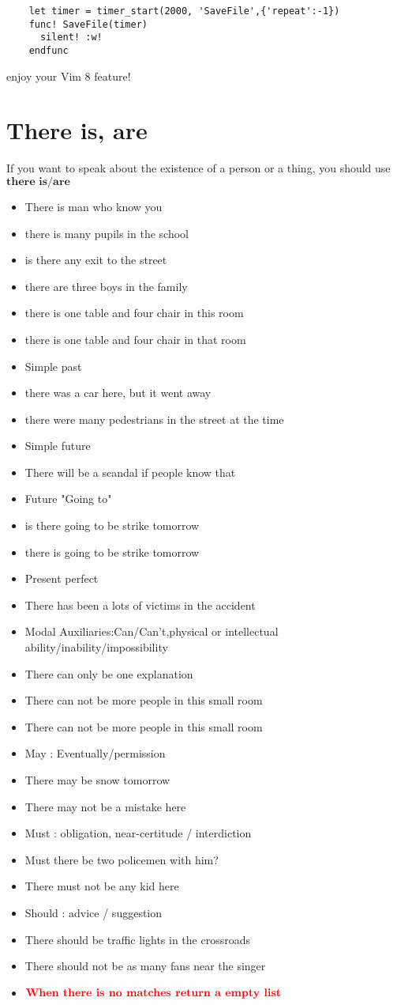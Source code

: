 \documentclass{article}
\begin{document}
\begin{verbatim}
    let timer = timer_start(2000, 'SaveFile',{'repeat':-1})
    func! SaveFile(timer)
      silent! :w!
    endfunc
\end{verbatim} 

enjoy your Vim 8 feature!

\pagebreak
\section{There is, are}
If you want to speak about the existence of a person or a thing, you should use 
$\textbf{there is/are}$

\begin{itemize}
\item[] There is man who know you 
\item[] there is many pupils in the school  
\item[] is there any exit to the street    
\item[] there are three boys in the family   
\item[] there is one table and four chair in this room  
\item[] there is one table and four chair in that room  
\item Simple past  
\item[] there was a car here, but it went away 
\item[] there were many pedestrians in the street at the time
\item Simple future
\item[] There will be a scandal if people know that
\item Future "Going to" 
\item[] is there going to be strike tomorrow
\item[] there is going to be strike tomorrow 
\item Present perfect
\item[] There has been a lots of victims in the accident
\item Modal Auxiliaries:Can/Can't,physical or intellectual ability/inability/impossibility
\item[] There can only be one explanation
\item[] There can not be more people in this small room
\item[] There can not be more people in this small room
\item May : Eventually/permission
\item[] There may be snow tomorrow
\item[] There may not be a mistake here
\item Must : obligation, near-certitude / interdiction
\item[] Must there be two policemen with him?
\item[] There must not be any kid here
\item Should : advice / suggestion
\item[] There should be traffic lights in the crossroads
\item[] There should not be as many fans near the singer
\item $\color{red}{\textbf{When there is no matches return a empty list}}$
\end{itemize}
\end{document}
